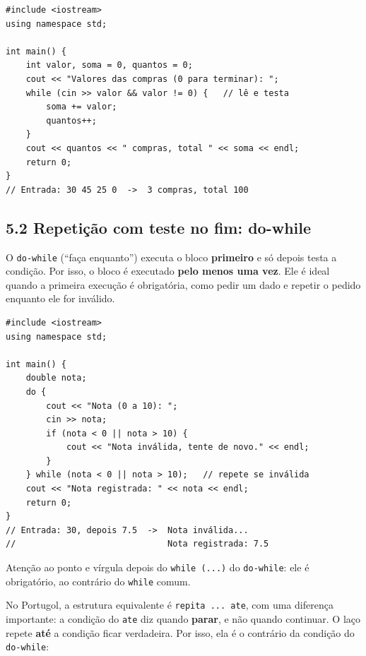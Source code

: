 \begin{codigo}
\begin{Verbatim}[breaklines=true, breaksymbolleft={}, fontsize=\footnotesize]
#include <iostream>
using namespace std;

int main() {
    int valor, soma = 0, quantos = 0;
    cout << "Valores das compras (0 para terminar): ";
    while (cin >> valor && valor != 0) {   // lê e testa
        soma += valor;
        quantos++;
    }
    cout << quantos << " compras, total " << soma << endl;
    return 0;
}
// Entrada: 30 45 25 0  ->  3 compras, total 100
\end{Verbatim}
\end{codigo}

\subsection{5.2 Repetição com teste no fim: do-while}

O \texttt{do-while} (``faça enquanto'') executa o bloco \textbf{primeiro} e só depois testa a condição. Por isso, o bloco é executado \textbf{pelo menos uma vez}. Ele é ideal quando a primeira execução é obrigatória, como pedir um dado e repetir o pedido enquanto ele for inválido.

\begin{codigo}
\begin{Verbatim}[breaklines=true, breaksymbolleft={}, fontsize=\footnotesize]
#include <iostream>
using namespace std;

int main() {
    double nota;
    do {
        cout << "Nota (0 a 10): ";
        cin >> nota;
        if (nota < 0 || nota > 10) {
            cout << "Nota inválida, tente de novo." << endl;
        }
    } while (nota < 0 || nota > 10);   // repete se inválida
    cout << "Nota registrada: " << nota << endl;
    return 0;
}
// Entrada: 30, depois 7.5  ->  Nota inválida...
//                              Nota registrada: 7.5
\end{Verbatim}
\end{codigo}

Atenção ao ponto e vírgula depois do \texttt{while (...)} do \texttt{do-while}: ele é obrigatório, ao contrário do \texttt{while} comum.

No Portugol, a estrutura equivalente é \texttt{repita ... ate}, com uma diferença importante: a condição do \texttt{ate} diz quando \textbf{parar}, e não quando continuar. O laço repete \textbf{até} a condição ficar verdadeira. Por isso, ela é o contrário da condição do \texttt{do-while}:

